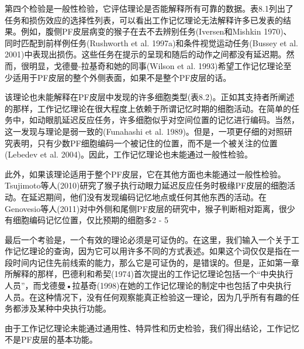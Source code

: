 \par 
第四个检验是一般性检验，它评估理论是否能解释所有可靠的数据。表8.1列出了任务和损伤效应的选择性列表，可以看出工作记忆理论无法解释许多已发表的结果。例如，腹侧PF皮层病变的猴子在去不去辨别任务(Iversen和Mishkin 1970)、同时匹配到前样例任务(Rushworth et al. 1997a)和条件视觉运动任务(Bussey et al. 2001)中表现出损伤。这些任务在提示的呈现和随后的动作之间都没有延迟期。然而，很明显，戈德曼-拉基奇和她的同事(Wilson et al. 1993)希望工作记忆理论至少适用于PF皮层的整个外侧表面，如果不是整个PF皮层的话。
\par 
该理论也未能解释在PF皮层中发现的许多细胞类型(表8.2)。正如其支持者所阐述的那样，工作记忆理论在很大程度上依赖于所谓记忆时期的细胞活动。在简单的任务中，如动眼肌延迟反应任务，许多细胞似乎对空间位置的记忆进行编码。当然，这一发现与理论是弱一致的(Funahashi et al. 1989)。但是，一项更仔细的对照研究表明，只有少数PF细胞编码一个被记住的位置，而不是一个被关注的位置(Lebedev et al. 2004)。因此，工作记忆理论也未能通过一般性检验。
\par 
此外，如果该理论适用于整个PF皮层，它在其他方面也未能通过一般性检验。Tsujimoto等人(2010)研究了猴子执行动眼力延迟反应任务时极缘PF皮层的细胞活动。在延迟期间，他们没有发现编码记忆地点或任何其他东西的活动。在Genovesio等人(2011)对中外侧和尾侧PF皮层的研究中，猴子判断相对距离，很少有细胞编码记忆位置，仅比预期的细胞多2 - 5%
\par 
最后一个考验是，一个有效的理论必须是可证伪的。在这里，我们输入一个关于工作记忆理论的查询，因为它可以用许多不同的方式表述。如果这个词仅仅是指在一段时间内记住先前线索的能力，那么它是可证伪的，是错误的。但是，正如第一章所解释的那样，巴德利和希契(1974)首次提出的工作记忆理论包括一个“中央执行人员”，而戈德曼•拉基奇(1998)在她的工作记忆理论的制定中也包括了中央执行人员。在这种情况下，没有任何观察能真正检验这一理论，因为几乎所有有趣的任务都涉及某种中央执行功能。
\par 
由于工作记忆理论未能通过通用性、特异性和历史检验，我们得出结论，工作记忆不是PF皮层的基本功能。

